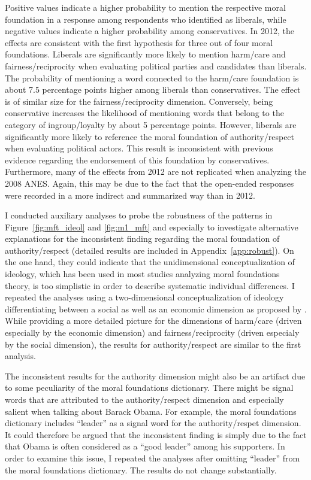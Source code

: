 \documentclass[12pt]{article}
\begin{document}
Positive values indicate a higher probability to mention the respective moral foundation in a response among respondents who identified as liberals, while negative values indicate a higher probability among conservatives. In 2012, the effects are consistent with the first hypothesis for three out of four moral foundations. Liberals are significantly more likely to mention harm/care and fairness/reciprocity when evaluating political parties and candidates than liberals. The probability of mentioning a word connected to the harm/care foundation is about 7.5 percentage points higher among liberals than conservatives. The effect is of similar size for the fairness/reciprocity dimension. Conversely, being conservative increases the likelihood of mentioning words that belong to the category of ingroup/loyalty by about 5 percentage points. However, liberals are significantly more likely to reference the moral foundation of authority/respect when evaluating political actors. This result is inconsistent with previous evidence regarding the endorsement of this foundation by conservatives. Furthermore, many of the effects from 2012 are not replicated when analyzing the 2008 ANES. Again, this may be due to the fact that the open-ended responses were recorded in a more indirect and summarized way than in 2012.

I conducted auxiliary analyses to probe the robustness of the patterns in Figure~\ref{fig:mft_ideol} and \ref{fig:m1_mft} and especially to investigate alternative explanations for the inconsistent finding regarding the moral foundation of authority/respect (detailed results are included in Appendix~\ref{app:robust}). On the one hand, they could indicate that the unidimensional conceptualization of ideology, which has been used in most studies analyzing moral foundations theory, is too simplistic in order to describe systematic individual differences. I repeated the analyses using a two-dimensional conceptualization of ideology differentiating between a social as well as an economic dimension as proposed by \citet{feldman2014understanding}. While providing a more detailed picture for the dimensions of harm/care (driven especially by the economic dimension) and fairness/reciprocity (driven especialy by the social dimension), the results for authority/respect are similar to the first analysis. 

The inconsistent results for the authority dimension might also be an artifact due to some peculiarity of the moral foundations dictionary. There might be signal words that are attributed to the authority/respect dimension and especially salient when talking about Barack Obama. For example, the moral foundations dictionary includes ``leader'' as a signal word for the authority/respet dimension. It could therefore be argued that the inconsistent finding is simply due to the fact that Obama is often considered as a ``good leader'' among his supporters. In order to examine this issue, I repeated the analyses after omitting ``leader'' from the moral foundations dictionary. The results do not change substantially.
\end{document}
